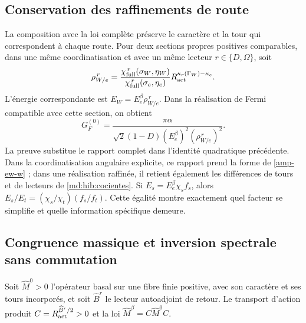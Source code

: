 \subsection{Conservation des raffinements de route}
\label{amp-ew-refinamiento}
La composition avec la loi complète préserve le caractère et la tour qui
correspondent à chaque route. Pour deux sections propres positives comparables,
dans une même coordinatisation et avec un même lecteur $r\in\{D,\Omega\}$, soit
\begin{equation}
 \rho_{W/e}^{\,r}
 =\frac{\chi_{\rm full}^{\,r}(\sigma_W,\eta_W)}
        {\chi_{\rm full}^{\,r}(\sigma_e,\eta_e)}
 R_{\rm act}^{\kappa_r(\Gamma_W)-\kappa_e}.
 \label{amp-ew-razon-completa}
\end{equation}
L’énergie correspondante est $E_W=E_e^\beta\rho_{W/e}^{\,r}$.
Dans la réalisation de Fermi compatible avec cette section, on obtient
\begin{equation}
 G_F^{(0)}=
 \frac{\pi\alpha}
 {\sqrt2(1-D)(E_e^\beta)^2(\rho_{W/e}^{\,r})^2}.
 \label{amp-ew-fermi-completo}
\end{equation}
La preuve substitue le rapport complet dans l’identité quadratique
précédente. Dans la coordinatisation angulaire explicite, ce rapport prend la forme de
\eqref{amp-ew-w} ; dans une réalisation raffinée, il retient également les
différences de tours et de lecteurs de \eqref{md:hib:cocientes}.
Si $E_s=E_e^\beta\chi_sf_s$, alors
$E_s/E_t=(\chi_s/\chi_t)(f_s/f_t)$. Cette égalité montre exactement
quel facteur se simplifie et quelle information spécifique demeure.

\subsection{Congruence massique et inversion spectrale sans commutation}
\label{amp-ew-congruencia}
Soit $\widehat M^0>0$ l’opérateur basal sur une fibre finie positive,
avec son caractère et ses tours incorporés, et soit $\widehat B^r$
le lecteur autoadjoint de retour. Le transport d’action produit
$C=R_{\rm act}^{\widehat B^r/2}>0$ et la loi
$\widehat M^\beta=C\widehat M^0C$.


